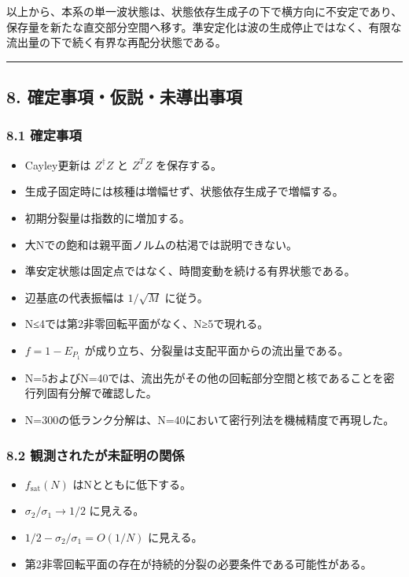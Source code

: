 \documentclass[
  a4paper,
]{ltjsarticle}
\providecommand{\tightlist}{%
  \setlength{\itemsep}{0pt}\setlength{\parskip}{0pt}}
\begin{document}
以上から、本系の単一波状態は、状態依存生成子の下で横方向に不安定であり、保存量を新たな直交部分空間へ移す。準安定化は波の生成停止ではなく、有限な流出量の下で続く有界な再配分状態である。

\begin{center}\rule{0.5\linewidth}{0.5pt}\end{center}

\subsection{8.
確定事項・仮説・未導出事項}\label{ux78baux5b9aux4e8bux9805ux4eeeux8aacux672aux5c0eux51faux4e8bux9805}

\subsubsection{8.1 確定事項}\label{ux78baux5b9aux4e8bux9805}

\begin{itemize}
\tightlist
\item
  Cayley更新は \(Z^\dagger Z\) と \(Z^T Z\) を保存する。
\item
  生成子固定時には核種は増幅せず、状態依存生成子で増幅する。
\item
  初期分裂量は指数的に増加する。
\item
  大Nでの飽和は親平面ノルムの枯渇では説明できない。
\item
  準安定状態は固定点ではなく、時間変動を続ける有界状態である。
\item
  辺基底の代表振幅は \(1/\sqrt M\) に従う。
\item
  N≤4では第2非零回転平面がなく、N≥5で現れる。
\item
  \(f=1-E_{P_1}\) が成り立ち、分裂量は支配平面からの流出量である。
\item
  N=5およびN=40では、流出先がその他の回転部分空間と核であることを密行列固有分解で確認した。
\item
  N=300の低ランク分解は、N=40において密行列法を機械精度で再現した。
\end{itemize}

\subsubsection{8.2
観測されたが未証明の関係}\label{ux89b3ux6e2cux3055ux308cux305fux304cux672aux8a3cux660eux306eux95a2ux4fc2}

\begin{itemize}
\tightlist
\item
  \(f_{\mathrm{sat}}(N)\) はNとともに低下する。
\item
  \(\sigma_2/\sigma_1\to1/2\) に見える。
\item
  \(1/2-\sigma_2/\sigma_1=O(1/N)\) に見える。
\item
  第2非零回転平面の存在が持続的分裂の必要条件である可能性がある。
\end{itemize}
\end{document}
